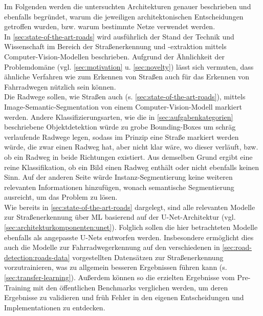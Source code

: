 Im Folgenden werden die untersuchten Architekturen genauer beschrieben und ebenfalls begründet, 
warum die jeweiligen architektonischen Entscheidungen getroffen wurden, bzw. warum bestimmte Netze verwendet werden. \\
In \autoref{sec:state-of-the-art-roads} wird ausführlich der Stand der Technik und Wissenschaft 
im Bereich der Straßenerkennung und -extraktion mittels Computer-Vision-Modellen beschrieben. 
Aufgrund der Ähnlichkeit der Problemdomäne (vgl. \autoref{sec:motivation} u. \autoref{sec:novelty}) 
lässt sich vermuten, dass ähnliche Verfahren wie 
zum Erkennen von Straßen auch für das Erkennen von Fahrradwegen nützlich sein können. 
\\
Die Radwege sollen, wie Straßen auch (s. \autoref{sec:state-of-the-art-roads}), 
mittels Image-Semantic-Segmentation von einem Computer-Vision-Modell 
markiert werden. Andere Klassifizierungsarten, wie die in \autoref{sec:aufgabenkategorien} beschriebene 
Objektdetektion würde zu grobe Bounding-Boxes um schräg verlaufende Radwege legen, sodass im Prinzip 
eine Straße markiert werden würde, die zwar einen Radweg hat, aber nicht klar wäre, wo dieser verläuft, 
bzw. ob ein Radweg in beide Richtungen existiert. Aus demselben Grund ergibt eine reine Klassifikation, 
ob ein Bild einen Radweg enthält oder nicht ebenfalls keinen Sinn. 
Auf der anderen Seite würde Instanz-Segmentierung keine weiteren relevanten Informationen hinzufügen, 
wonach semantische Segmentierung ausreicht, um das Problem zu lösen. \\
Wie bereits in \autoref{sec:state-of-the-art-roads} dargelegt, sind alle relevanten Modelle zur 
Straßenerkennung über \ac{ML} basierend auf der U-Net-Architektur (vgl. \ref{sec:architekturkomponenten:unet}).
Folglich sollen die hier betrachteten Modelle ebenfalls als angepasste U-Nets entworfen werden. 
Insbesondere ermöglicht dies auch die Modelle zur Fahrradwegerkennung auf den verschiedenen 
in \autoref{sec:road-detection:roads-data} vorgestellten Datensätzen zur Straßenerkennung vorzutrainieren, 
was zu allgemein besseren Ergebnissen führen kann (s. \autoref{sec:transfer-learning}). 
Außerdem können so die erzielten Ergebnisse vom Pre-Training mit den öffentlichen Benchmarks verglichen werden,
um deren Ergebnisse zu validieren und früh Fehler in den eigenen Entscheidungen und Implementationen zu entdecken.

\renewcommand{\labelenumii}{\theenumii}
\renewcommand{\theenumii}{\theenumi.\arabic{enumii}.}

